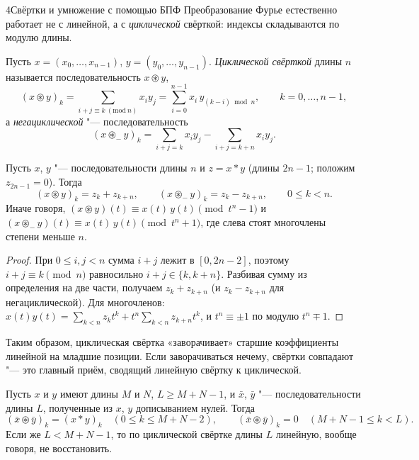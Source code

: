 \begin{lecture}{4}{Свёртки и умножение с помощью БПФ}
Преобразование Фурье естественно работает не с линейной, а с \emph{циклической} свёрткой:
индексы складываются по модулю длины.

\begin{definition}\label{l4:cyclic}
Пусть $x = (x_0, \dots, x_{n-1})$, $y = (y_0, \dots, y_{n-1})$. \emph{Циклической свёрткой}
длины $n$ называется последовательность $x \circledast y$,
\[
  (x \circledast y)_k = \sum_{i + j \equiv k \ (\mathrm{mod}\ n)} x_i y_j
  = \sum_{i=0}^{n-1} x_i\, y_{(k - i) \bmod n}, \qquad k = 0, \dots, n - 1,
\]
а \emph{негациклической} "--- последовательность
\[
  (x \circledast_{-} y)_k = \sum_{i + j = k} x_i y_j - \sum_{i + j = k + n} x_i y_j .
\]
\end{definition}

\begin{lemma}\label{l4:fold}
Пусть $x$, $y$ "--- последовательности длины $n$ и $z = x * y$ (длины $2n - 1$; положим
$z_{2n-1} = 0$). Тогда
\[
  (x \circledast y)_k = z_k + z_{k+n}, \qquad (x \circledast_{-} y)_k = z_k - z_{k+n}, \qquad
  0 \le k < n.
\]
Иначе говоря, $(x \circledast y)(t) \equiv x(t)\,y(t) \pmod{t^n - 1}$ и
$(x \circledast_{-} y)(t) \equiv x(t)\,y(t) \pmod{t^n + 1}$, где слева стоят многочлены степени
меньше $n$.
\end{lemma}

\begin{proof}
При $0 \le i, j < n$ сумма $i + j$ лежит в $[0, 2n - 2]$, поэтому $i + j \equiv k \pmod n$
равносильно $i + j \in \{k, k + n\}$. Разбивая сумму из определения на две части, получаем
$z_k + z_{k+n}$ (и $z_k - z_{k+n}$ для негациклической). Для многочленов:
$x(t)y(t) = \sum_{k<n} z_k t^k + t^n \sum_{k<n} z_{k+n} t^k$, и $t^n \equiv \pm 1$ по модулю
$t^n \mp 1$.
\end{proof}

Таким образом, циклическая свёртка «заворачивает» старшие коэффициенты линейной на младшие
позиции. Если заворачиваться нечему, свёртки совпадают "--- это главный приём, сводящий
линейную свёртку к циклической.

\begin{theorem}\label{l4:zeropad}
Пусть $x$ и $y$ имеют длины $M$ и $N$, $L \ge M + N - 1$, и $\bar x$, $\bar y$ "--- последовательности
длины $L$, полученные из $x$, $y$ дописыванием нулей. Тогда
\[
  (\bar x \circledast \bar y)_k = (x * y)_k \quad (0 \le k \le M + N - 2), \qquad
  (\bar x \circledast \bar y)_k = 0 \quad (M + N - 1 \le k < L).
\]
Если же $L < M + N - 1$, то по циклической свёртке длины $L$ линейную, вообще говоря,
не восстановить.
\end{theorem}


\end{lecture}
